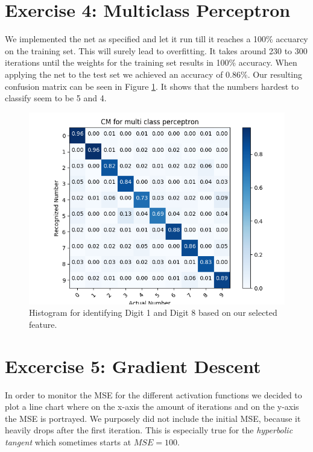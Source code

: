 \documentclass{article}
\begin{document}
\section{Exercise 4: Multiclass Perceptron}
We implemented the net as specified and let it run till it reaches a 100\% accuarcy on the training set. This will surely lead to overfitting.
It takes around 230 to 300 iterations until the weights for the training set results in 100\% accuracy.
When applying the net to the test set we achieved an accuracy of 0.86\%.
Our resulting confusion matrix can be seen in Figure \ref{fig:cmperceptron}. It shows that the numbers hardest to classify seem to be 5 and 4.
\begin{figure}[H]
\centering
\includegraphics[width=0.9\linewidth]{img/cmperceptron.png}
\caption{Histogram for identifying Digit 1 and Digit 8 based on our selected feature.}
\label{fig:cmperceptron}
\end{figure}

\section{Excercise 5: Gradient Descent}
In order to monitor the MSE for the different activation functions we decided to plot a line chart where on the x-axis the amount of iterations and on the y-axis the MSE is portrayed. We purposely did not include the initial MSE, because it heavily drops after the first iteration. This is especially true for the \emph{hyperbolic tangent} which sometimes starts at $MSE=100$.
\end{document}
